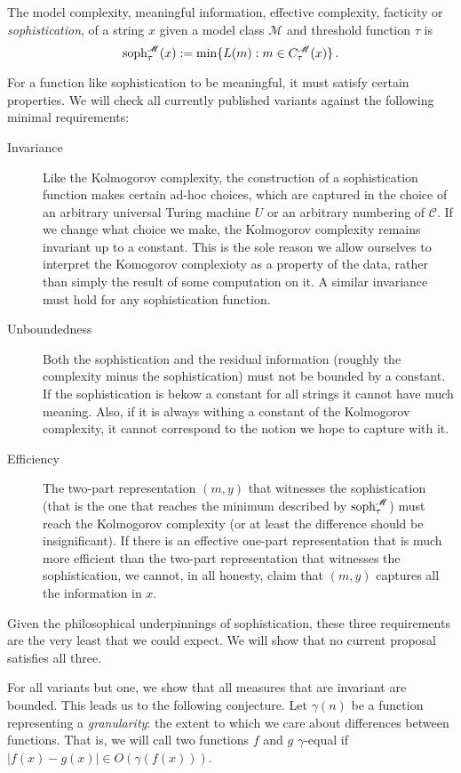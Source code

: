 \documentclass{style/llncs}
\newcommand{\M}{\mathscr M}
\newcommand{\C}{\mathscr C}
\newcommand{\tn}[1]{\textnormal{#1}}
\newcommand{\s}{\tn{soph}}
\newcommand{\p}{\,\text{.}}
\begin{document}
\begin{definition}[Sophistication]
  The model complexity, meaningful information, effective complexity, facticity or \emph{sophistication},  of a string $x$ given a model class $\M$ and threshold function $\tau$ is
  \[
  \s_\tau^{\M}(x):=\min\{L(m):m\in C^\M_\tau(x)\}\p
  \]\label{definition:sophistication}
\end{definition}
For a function like sophistication to be meaningful, it must satisfy certain properties. We will check all currently published variants against the following minimal requirements:

\begin{description}
  \item[Invariance] Like the Kolmogorov complexity, the construction of a sophistication function makes certain ad-hoc choices, which are captured in the choice of an arbitrary universal Turing machine $U$ or an arbitrary numbering of $\C$. If we change what choice we make, the Kolmogorov complexity remains invariant up to a constant. This is the sole reason we allow ourselves to interpret the Komogorov complexioty as a property of the data, rather than simply the result of some computation on it. A similar invariance must hold for any sophistication function.
   \item[Unboundedness] Both the sophistication and the residual information (roughly the complexity minus the sophistication) must not be bounded by a constant. If the sophistication is bekow a constant for all strings it cannot have much meaning. Also, if it is always withing a constant of the Kolmogorov complexity, it cannot correspond to the notion we hope to capture with it.
   \item[Efficiency] The two-part representation $(m, y)$ that witnesses the sophistication (that is the one that reaches the minimum described by $\s^\M_\tau$) must reach the Kolmogorov complexity (or at least the difference should be insignificant). If there is an effective one-part representation that is much more efficient than the two-part representation that witnesses the sophistication, we cannot, in all honesty, claim that $(m, y)$ captures all the information in $x$.
\end{description}

Given the philosophical underpinnings of sophistication, these three requirements are the very least that we could expect. We will show that no current proposal satisfies all three. 

For all variants but one, we show that all measures that are invariant are bounded. This leads us to the following conjecture. Let $\gamma(n)$ be a function representing a \emph{granularity}: the extent to which we care about differences between functions. That is, we will call two functions $f$ and $g$ $\gamma$-equal if $|f(x) - g(x)| \in O\left(\gamma\left(f(x)\right)\right)$.
\end{document}
